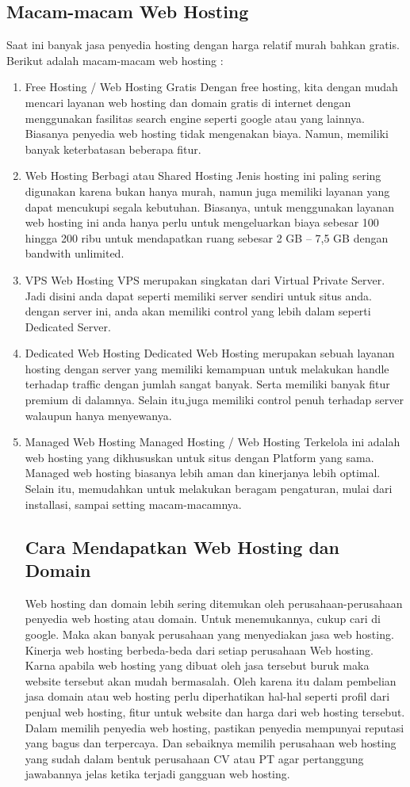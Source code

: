\documentclass[12pt, a4paper]{article}
\begin{document}
\subsection{Macam-macam Web Hosting}
Saat ini banyak jasa penyedia hosting dengan harga relatif murah bahkan gratis.
Berikut adalah macam-macam web hosting :
\begin{enumerate}
\item Free Hosting / Web Hosting Gratis
	  Dengan free hosting, kita dengan mudah mencari layanan web hosting dan domain gratis di internet dengan
	  menggunakan fasilitas search engine seperti google atau yang lainnya. Biasanya penyedia web hosting
	  tidak mengenakan biaya. Namun, memiliki banyak keterbatasan beberapa fitur.
\item Web Hosting Berbagi atau Shared Hosting
	  Jenis hosting ini paling sering digunakan karena bukan hanya murah, namun juga memiliki layanan yang
	  dapat mencukupi segala kebutuhan. Biasanya, untuk menggunakan layanan web hosting ini anda hanya perlu
	  untuk mengeluarkan
	  biaya sebesar 100 hingga 200 ribu untuk mendapatkan ruang sebesar 2 GB – 7,5 GB dengan bandwith
	  unlimited.
\item VPS Web Hosting
	  VPS merupakan singkatan dari Virtual Private Server. Jadi disini anda dapat seperti memiliki server
	  sendiri untuk situs anda. dengan server ini, anda akan memiliki control yang lebih dalam seperti
	  Dedicated Server.
\item Dedicated Web Hosting
	  Dedicated Web Hosting merupakan sebuah layanan hosting dengan server yang memiliki kemampuan untuk
	  melakukan handle terhadap traffic dengan jumlah sangat banyak. Serta memiliki banyak fitur premium di
	  dalamnya. Selain itu,juga memiliki control penuh terhadap server walaupun  hanya menyewanya.
\item Managed Web Hosting
	  Managed Hosting / Web Hosting Terkelola ini adalah web hosting yang dikhususkan untuk situs dengan
	  Platform yang sama. Managed web hosting biasanya lebih aman dan kinerjanya lebih optimal. Selain itu,
	  memudahkan untuk melakukan beragam pengaturan, mulai dari installasi, sampai setting macam-macamnya.

\subsection{Cara Mendapatkan Web Hosting dan Domain}
	Web hosting dan domain lebih sering ditemukan oleh perusahaan-perusahaan penyedia web hosting atau domain. Untuk menemukannya, cukup cari di google. Maka akan banyak perusahaan yang menyediakan jasa web hosting. Kinerja web hosting berbeda-beda dari setiap perusahaan Web hosting. Karna apabila web hosting yang dibuat oleh jasa tersebut buruk maka website tersebut akan mudah bermasalah. Oleh karena itu dalam pembelian jasa domain atau web hosting perlu diperhatikan hal-hal seperti profil dari penjual web hosting, fitur untuk website dan harga dari web hosting tersebut. Dalam memilih penyedia web hosting, pastikan penyedia mempunyai reputasi yang bagus dan terpercaya. Dan sebaiknya memilih perusahaan web hosting yang sudah dalam bentuk perusahaan CV atau PT agar pertanggung jawabannya jelas ketika terjadi gangguan web hosting.
	

\end{enumerate}
\end{document}
